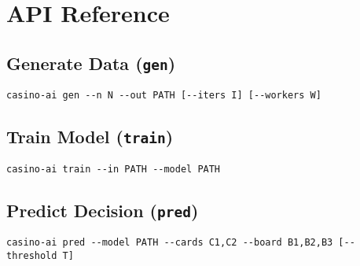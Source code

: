 \section{API Reference}

\subsection{Generate Data (\texttt{gen})}
\begin{verbatim}
casino-ai gen --n N --out PATH [--iters I] [--workers W]
\end{verbatim}

\subsection{Train Model (\texttt{train})}
\begin{verbatim}
casino-ai train --in PATH --model PATH
\end{verbatim}

\subsection{Predict Decision (\texttt{pred})}
\begin{verbatim}
casino-ai pred --model PATH --cards C1,C2 --board B1,B2,B3 [--threshold T]
\end{verbatim}
